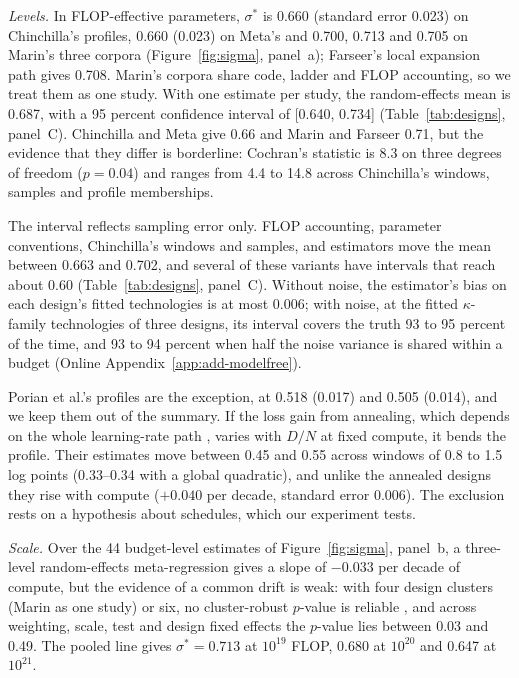 \textit{Levels.} In FLOP-effective parameters, $\sigma^*$ is 0.660 (standard error 0.023) on Chinchilla's profiles,
0.660 (0.023) on Meta's and 0.700, 0.713 and 0.705 on Marin's three corpora (Figure~\ref{fig:sigma}, panel~a); Farseer's
local expansion path gives 0.708. Marin's corpora share code, ladder and FLOP accounting, so we treat them as one study.
With one estimate per study, the random-effects mean is 0.687, with a 95 percent confidence interval of [0.640, 0.734]
(Table~\ref{tab:designs}, panel~C). Chinchilla and Meta give 0.66 and Marin and Farseer 0.71, but the evidence that
they differ is borderline: Cochran's statistic is 8.3 on three degrees of freedom ($p=0.04$) and ranges from 4.4 to
14.8 across Chinchilla's windows, samples and profile memberships.

The interval reflects sampling error only. FLOP accounting, parameter conventions, Chinchilla's windows and samples, and
estimators move the mean between 0.663 and 0.702, and several of these variants have intervals that reach about 0.60
(Table~\ref{tab:designs}, panel~C). Without noise, the estimator's bias on each design's fitted technologies is
at most 0.006; with noise, at the fitted $\kappa$-family technologies of three designs, its interval covers the truth 93
to 95 percent of the time, and 93 to 94 percent when half the noise variance is shared within a budget (Online
Appendix~\ref{app:add-modelfree}).

Porian et al.'s profiles are the exception, at 0.518 (0.017) and 0.505 (0.014), and we keep them out of the summary.
If the loss gain from annealing, which depends on the whole learning-rate path
\citep{hagele2024scaling,tissue2024scaling}, varies with $D/N$ at fixed compute, it bends the profile. Their estimates move between 0.45 and 0.55 across windows of 0.8 to 1.5 log points
(0.33--0.34 with a global quadratic), and unlike the annealed designs they rise with compute ($+0.040$ per decade,
standard error 0.006). The exclusion rests on a hypothesis about schedules, which our experiment tests.

\textit{Scale.} Over the 44 budget-level estimates of Figure~\ref{fig:sigma}, panel~b, a three-level random-effects meta-regression
\citep{konstantopoulos2011fixed} gives a slope of $-0.033$ per decade of compute, but the evidence of a common drift is
weak: with four design clusters (Marin as one study) or six, no cluster-robust $p$-value is reliable
\citep{bell2002bias,pustejovsky2018small}, and across weighting, scale, test and design fixed effects the $p$-value lies
between 0.03 and 0.49. The pooled line gives $\sigma^*=0.713$ at $10^{19}$ FLOP, 0.680 at $10^{20}$ and 0.647 at
$10^{21}$.

